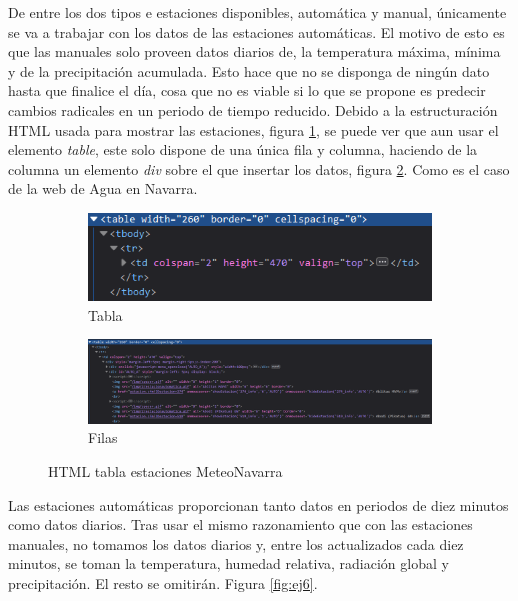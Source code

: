 De entre los dos tipos e estaciones disponibles, automática y manual, únicamente se va a trabajar con los datos de las estaciones automáticas. El motivo de esto es que las manuales solo proveen datos diarios de, la temperatura máxima, mínima y de la precipitación acumulada. Esto hace que no se disponga de ningún dato hasta que finalice el día, cosa que no es viable si lo que se propone es predecir cambios radicales en un periodo de tiempo reducido.
\newline
\newline
Debido a la estructuración HTML usada para mostrar las estaciones, figura \ref{fig:sub5}, se puede ver que aun usar el elemento \textit{table}, este solo dispone de una única fila y columna, haciendo de la columna un elemento \textit{div} sobre el que insertar los datos, figura \ref{fig:sub6}. Como es el caso de la web de Agua en Navarra.

\begin{figure} [H]
	\centering
	\begin{subfigure}{.5\textwidth}
		\centering
		\includegraphics[width=.8\linewidth]{fig/MeteoNavarraCodeHTMLTable.png}
		\caption{Tabla}
		\label{fig:sub5}
	\end{subfigure}%
	\begin{subfigure}{.5\textwidth}
		\centering
		\includegraphics[width=.9\linewidth]{fig/MeteoNavarraCodeHTML.png}
		\caption{Filas}
		\label{fig:sub6}
	\end{subfigure}
	\caption{HTML tabla estaciones MeteoNavarra}
	\label{fig:ej28}
\end{figure}

Las estaciones automáticas proporcionan tanto datos en periodos de diez minutos como datos diarios. Tras usar el mismo razonamiento que con las estaciones manuales, no tomamos los datos diarios y, entre los actualizados cada diez minutos, se toman la temperatura, humedad relativa, radiación global y precipitación. El resto se omitirán. Figura \ref{fig:ej6}.

